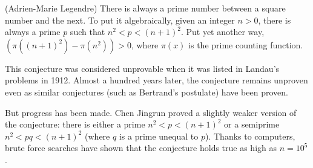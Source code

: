 \documentclass[12pt]{article}
\begin{document}
(Adrien-Marie Legendre) There is always a prime number between a square number and the next. To put it algebraically, given an integer $n > 0$, there is always a prime $p$ such that $n^2 < p < (n + 1)^2$. Put yet another way, $(\pi((n + 1)^2) - \pi(n^2)) > 0$, where $\pi(x)$ is the prime counting function.

This conjecture was considered unprovable when it was listed in Landau's problems in 1912. Almost a hundred years later, the conjecture remains unproven even as similar conjectures (such as Bertrand's postulate) have been proven.

But progress has been made. Chen Jingrun proved a slightly weaker version of the conjecture: there is either a prime $n^2 < p < (n + 1)^2$ or a semiprime $n^2 < pq < (n + 1)^2$ (where $q$ is a prime unequal to $p$). Thanks to computers, brute force searches have shown that the conjecture holds true as high as $n = 10^5$. %
\end{document}
